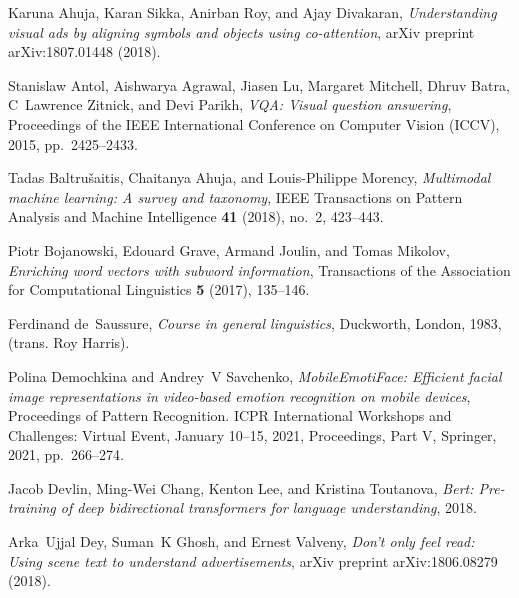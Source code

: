 \documentclass{zapiski}
\begin{document}
\providecommand{\bysame}{\leavevmode\hbox to3em{\hrulefill}\thinspace}
\providecommand{\MR}{\relax\ifhmode\unskip\space\fi MR }
\providecommand{\MRhref}[2]{%
  \href{http://www.ams.org/mathscinet-getitem?mr=#1}{#2}
}
\providecommand{\href}[2]{#2}
\begin{thebibliography}{10}

Karuna Ahuja, Karan Sikka, Anirban Roy, and Ajay Divakaran, \emph{Understanding
  visual ads by aligning symbols and objects using co-attention}, arXiv
  preprint arXiv:1807.01448 (2018).

Stanislaw Antol, Aishwarya Agrawal, Jiasen Lu, Margaret Mitchell, Dhruv Batra,
  C~Lawrence Zitnick, and Devi Parikh, \emph{{VQA}: Visual question answering},
  Proceedings of the IEEE International Conference on Computer Vision (ICCV),
  2015, pp.~2425--2433.

Tadas Baltru{\v{s}}aitis, Chaitanya Ahuja, and Louis-Philippe Morency,
  \emph{Multimodal machine learning: A survey and taxonomy}, IEEE Transactions
  on Pattern Analysis and Machine Intelligence \textbf{41} (2018), no.~2,
  423--443.

Piotr Bojanowski, Edouard Grave, Armand Joulin, and Tomas Mikolov,
  \emph{Enriching word vectors with subword information}, Transactions of the
  Association for Computational Linguistics \textbf{5} (2017), 135--146.

Ferdinand de~Saussure, \emph{Course in general linguistics}, Duckworth, London,
  1983, (trans. Roy Harris).

Polina Demochkina and Andrey~V Savchenko, \emph{{MobileEmotiFace}: Efficient
  facial image representations in video-based emotion recognition on mobile
  devices}, Proceedings of Pattern Recognition. ICPR International Workshops
  and Challenges: Virtual Event, January 10--15, 2021, Proceedings, Part V,
  Springer, 2021, pp.~266--274.

Jacob Devlin, Ming-Wei Chang, Kenton Lee, and Kristina Toutanova, \emph{Bert:
  Pre-training of deep bidirectional transformers for language understanding},
  2018.

Arka~Ujjal Dey, Suman~K Ghosh, and Ernest Valveny, \emph{Don't only feel read:
  Using scene text to understand advertisements}, arXiv preprint
  arXiv:1806.08279 (2018).


\end{thebibliography}
\end{document}
